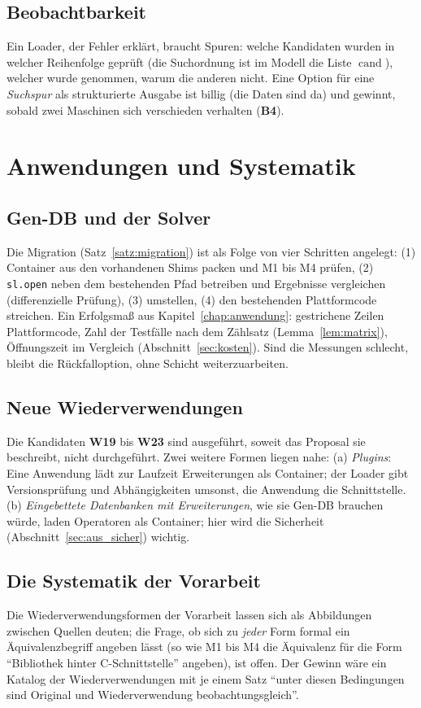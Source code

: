 \documentclass[a4paper,12pt,twoside]{report}
\DeclareRobustCommand{\_}{\ifmmode\mbox{\textunderscore}\else\textunderscore\allowbreak{}\fi}
\theoremstyle{definition}
\newcommand{\W}[1]{\textbf{W#1}}
\newcommand{\Bf}[1]{\textbf{B#1}}
\newcommand{\cand}{\operatorname{cand}}
\begin{document}
\subsection{Beobachtbarkeit}
Ein Loader, der Fehler erklärt, braucht Spuren: welche Kandidaten wurden in welcher Reihenfolge geprüft (die Suchordnung ist im Modell die Liste $\cand$), welcher wurde genommen, warum die anderen nicht. Eine Option für eine \emph{Suchspur} als strukturierte Ausgabe ist billig (die Daten sind da) und gewinnt, sobald zwei Maschinen sich verschieden verhalten (\Bf{4}).

\section{Anwendungen und Systematik}

\subsection{Gen-DB und der Solver}
Die Migration (Satz~\ref{satz:migration}) ist als Folge von vier Schritten angelegt: (1) Container aus den vorhandenen Shims packen und M1 bis M4 prüfen, (2) \texttt{sl.open} neben dem bestehenden Pfad betreiben und Ergebnisse vergleichen (differenzielle Prüfung), (3) umstellen, (4) den bestehenden Plattformcode streichen. Ein Erfolgsmaß aus Kapitel~\ref{chap:anwendung}: gestrichene Zeilen Plattformcode, Zahl der Testfälle nach dem Zählsatz (Lemma~\ref{lem:matrix}), Öffnungszeit im Vergleich (Abschnitt~\ref{sec:kosten}). Sind die Messungen schlecht, bleibt die Rückfalloption, ohne Schicht weiterzuarbeiten.

\subsection{Neue Wiederverwendungen}
Die Kandidaten \W{19} bis \W{23} sind ausgeführt, soweit das Proposal sie beschreibt, nicht durchgeführt. Zwei weitere Formen liegen nahe: (a) \emph{Plugins}: Eine Anwendung lädt zur Laufzeit Erweiterungen als Container; der Loader gibt Versionsprüfung und Abhängigkeiten umsonst, die Anwendung die Schnittstelle. (b) \emph{Eingebettete Datenbanken mit Erweiterungen}, wie sie Gen-DB brauchen würde, laden Operatoren als Container; hier wird die Sicherheit (Abschnitt~\ref{sec:aus_sicher}) wichtig.

\subsection{Die Systematik der Vorarbeit}
Die Wiederverwendungsformen der Vorarbeit lassen sich als Abbildungen zwischen Quellen deuten; die Frage, ob sich zu \emph{jeder} Form formal ein Äquivalenzbegriff angeben lässt (so wie M1 bis M4 die Äquivalenz für die Form ``Bibliothek hinter C-Schnittstelle'' angeben), ist offen. Der Gewinn wäre ein Katalog der Wiederverwendungen mit je einem Satz ``unter diesen Bedingungen sind Original und Wiederverwendung beobachtungsgleich''.
\end{document}
